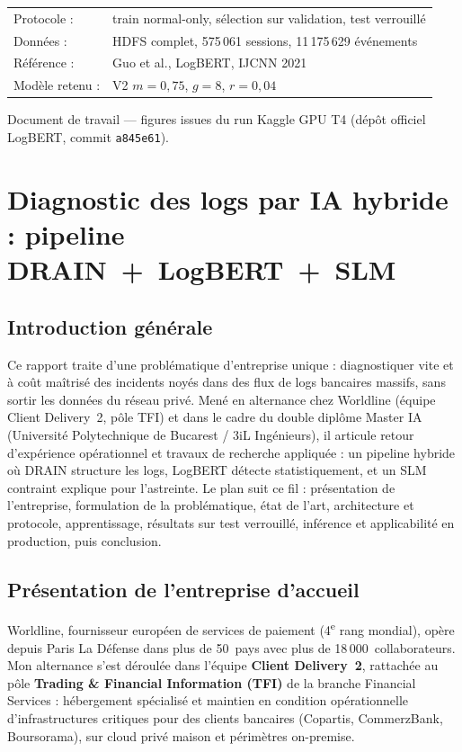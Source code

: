\documentclass[12pt,a4paper]{report}
\begin{document}
\begin{titlepage}
\begin{center}
\begin{tabular}{ll}
\hline
Protocole : & train normal-only, sélection sur validation, test verrouillé \\
Données : & HDFS complet, 575\,061 sessions, 11\,175\,629 événements \\
Référence : & Guo et al., LogBERT, IJCNN 2021 \\
Modèle retenu : & V2 $m{=}0{,}75$, $g{=}8$, $r{=}0{,}04$ \\
\hline
\end{tabular}
\vfill
{\normalsize Document de travail — figures issues du run Kaggle GPU T4 (dépôt officiel LogBERT, commit \texttt{a845e61}). \par}
\end{center}
\end{titlepage}

\tableofcontents
\newpage

\chapter{Diagnostic des logs par IA hybride : pipeline DRAIN~+~LogBERT~+~SLM}

\section{Introduction générale}

Ce rapport traite d'une problématique d'entreprise unique : diagnostiquer vite et à coût maîtrisé des incidents noyés dans des flux de logs bancaires massifs, sans sortir les données du réseau privé. Mené en alternance chez Worldline (équipe Client Delivery~2, pôle TFI) et dans le cadre du double diplôme Master IA (Université Polytechnique de Bucarest / 3iL Ingénieurs), il articule retour d'expérience opérationnel et travaux de recherche appliquée : un pipeline hybride où DRAIN structure les logs, LogBERT détecte statistiquement, et un SLM contraint explique pour l'astreinte. Le plan suit ce fil : présentation de l'entreprise, formulation de la problématique, état de l'art, architecture et protocole, apprentissage, résultats sur test verrouillé, inférence et applicabilité en production, puis conclusion.

\section{Présentation de l'entreprise d'accueil}

Worldline, fournisseur européen de services de paiement (4\textsuperscript{e} rang mondial), opère depuis Paris La Défense dans plus de 50~pays avec plus de 18\,000~collaborateurs. Mon alternance s'est déroulée dans l'équipe \textbf{Client Delivery~2}, rattachée au pôle \textbf{Trading \& Financial Information (TFI)} de la branche Financial Services : hébergement spécialisé et maintien en condition opérationnelle d'infrastructures critiques pour des clients bancaires (Copartis, CommerzBank, Boursorama), sur cloud privé maison et périmètres on-premise.
\end{document}

